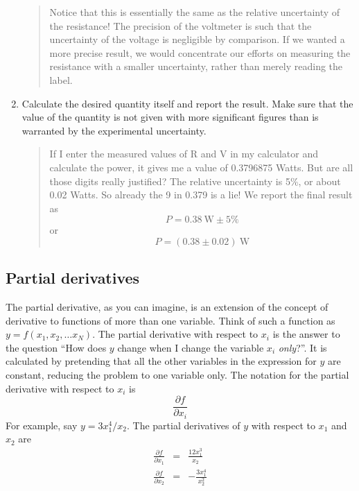 \documentclass[justified]{tufte-handout}
\begin{document}
\begin{enumerate}
\begin{quote}
Notice that this is essentially the same as the relative uncertainty of the
resistance! The precision of the voltmeter is such that the
uncertainty of the voltage is negligible by comparison. If we wanted a
more precise result, we would concentrate our efforts on measuring the
resistance with a smaller uncertainty, rather than merely reading the
label. 
  \end{quote}
\item
  Calculate the desired quantity itself and report the result. Make
  sure that the value of the quantity is not given with more
  significant figures than is warranted by the experimental uncertainty.
  \begin{quote}
    If I enter the measured values of R and V in my calculator and
    calculate the power, it gives me a value of 0.3796875 Watts. But
    are all those digits really justified? The relative uncertainty is
    5\%, or about 0.02 Watts. So already the 9 in 0.379 is a lie! We
    report the final result as
    \begin{equation}
      \label{eq:errors_18}
      P=0.38~\mbox{W}\pm 5\% 
    \end{equation}
    or
    \begin{equation}
      \label{eq:errors_19}
      P=(0.38\pm 0.02)~\mbox{W}
    \end{equation}
  \end{quote}
\end{enumerate}
\clearpage

\begin{appendices}
\section{Partial derivatives}\label{app:partial}
The partial derivative, as you can imagine, is an extension of the
concept of derivative to functions of more than one variable. Think of
such a function as $y=f(x_1,x_2,\ldots x_N)$. The partial derivative
with respect to $x_i$
is the answer to the question ``How does $y$ change when I change the
variable $x_i$ \textit{only}?''. It is calculated by pretending that
all the other variables in the expression for $y$ are constant,
reducing the problem to one variable only. The notation for the
partial derivative with respect to $x_i$ is
\begin{equation}
  \label{eq:errors_20}
  \frac{\partial f}{\partial x_i}
\end{equation}
For example, say $y=3x_1^4/x_2$. The partial derivatives of $y$ with
respect to $x_1$ and $x_2$ are
\begin{eqnarray}
  \label{eq:errors_21}
  \frac{\partial f}{\partial x_1}&=&\frac{12x_1^3}{x_2}\\
  \frac{\partial f}{\partial x_2}&=&-\frac{3x_1^4}{x_2^2}
\end{eqnarray}
\end{appendices}
\clearpage
\end{document}
